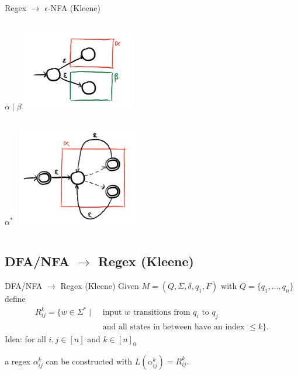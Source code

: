 \documentclass{beamer}
\begin{document}
\begin{frame}{Regex $\to$ $\epsilon$-NFA (Kleene)}
    \begin{columns}
        $\alpha \mid \beta$
        \includegraphics[width=5cm]{materials/images/regex_to_nfa_alternative.png}
    \end{columns}\pause
    \begin{columns}
        $\alpha^*$
        \includegraphics[width=5.5cm]{materials/images/regex_to_nfa_repetition.png}
    \end{columns}
\end{frame}

\subsection{DFA/NFA $\to$ Regex (Kleene)}

\begin{frame}{DFA/NFA $\to$ Regex (Kleene)}
    Given $M = (Q, \Sigma, \delta, q_1, F)$ with $Q = \{q_1, \dots, q_n\}$ define
    \begin{align*}
        R_{ij}^k = \{w \in \Sigma^* \mid &\text{ input } w \text{ transitions from } q_i \text{ to } q_j \\
        &\text{ and all states in between have an index  } \leq k\}.
    \end{align*}\pause
    Idea: for all $i, j \in [n]$ and $k \in [n]_0$\par
    a regex $\alpha_{ij}^k$ can be constructed with $L(\alpha_{ij}^k) = R_{ij}^k$.
\end{frame}
\end{document}
